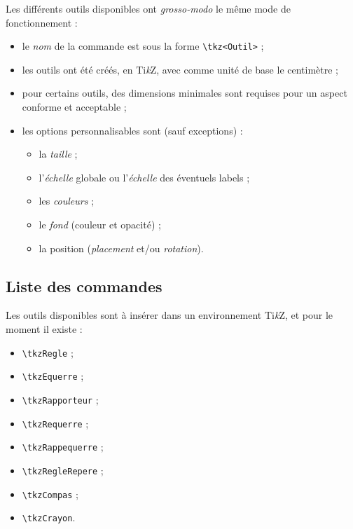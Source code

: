 \documentclass[french,a4paper,11pt]{article}
\providecommand\tikzlogo{Ti\textit{k}Z}
\let\TikZ\tikzlogo
\begin{document}
\begin{tipblock}
Les différents outils disponibles ont \textit{grosso-modo} le même mode de fonctionnement :

\begin{itemize}
	\item le \textit{nom} de la commande est sous la forme \texttt{\textbackslash tkz<Outil>} ;
	\item les outils ont été créés, en \TikZ, avec comme unité de base le centimètre ;
	\item pour certains outils, des dimensions minimales sont requises pour un aspect conforme et acceptable ;
	\item les options personnalisables sont (sauf exceptions) :
	\begin{itemize}
		\item la \textit{taille} ;
		\item l'\textit{échelle} globale ou l'\textit{échelle} des éventuels labels ;
		\item les \textit{couleurs} ;
		\item le \textit{fond} (couleur et opacité) ;
		\item la position (\textit{placement} et/ou \textit{rotation}).
	\end{itemize}
\end{itemize}
\vspace*{-\baselineskip}\leavevmode
\end{tipblock}

\subsection{Liste des commandes}

\begin{cautionblock}
Les outils disponibles sont à insérer dans un environnement \TikZ, et pour le moment il existe :
\begin{itemize}
	\item \texttt{\textbackslash tkzRegle} ;
	\item \texttt{\textbackslash tkzEquerre} ;
	\item \texttt{\textbackslash tkzRapporteur} ;
	\item \texttt{\textbackslash tkzRequerre} ;
	\item \texttt{\textbackslash tkzRappequerre} ;
	\item \texttt{\textbackslash tkzRegleRepere} ;
	\item \texttt{\textbackslash tkzCompas} ;
	\item \texttt{\textbackslash tkzCrayon}.
\end{itemize}
\vspace*{-\baselineskip}\leavevmode
\end{cautionblock}
\end{document}
